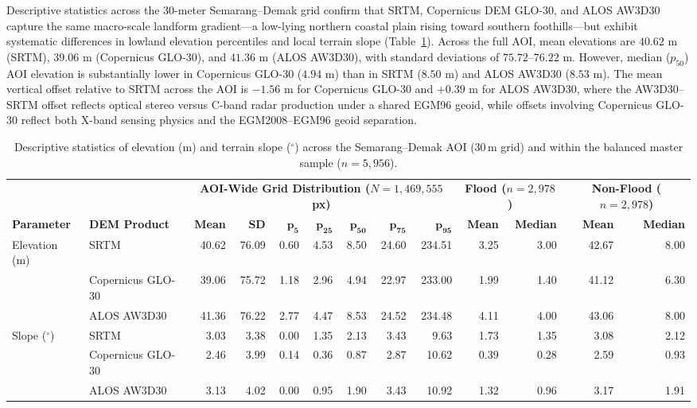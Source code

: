 \documentclass[11pt,twoside]{article}
\begin{document}
Descriptive statistics across the 30-meter Semarang--Demak grid confirm that SRTM, Copernicus DEM GLO-30, and ALOS AW3D30 capture the same macro-scale landform gradient---a low-lying northern coastal plain rising toward southern foothills---but exhibit systematic differences in lowland elevation percentiles and local terrain slope (Table~\ref{tab:dem-stats}). Across the full AOI, mean elevations are $40.62\text{ m}$ (SRTM), $39.06\text{ m}$ (Copernicus GLO-30), and $41.36\text{ m}$ (ALOS AW3D30), with standard deviations of $75.72\text{--}76.22\text{ m}$. However, median ($p_{50}$) AOI elevation is substantially lower in Copernicus GLO-30 ($4.94\text{ m}$) than in SRTM ($8.50\text{ m}$) and ALOS AW3D30 ($8.53\text{ m}$). The mean vertical offset relative to SRTM across the AOI is $-1.56\text{ m}$ for Copernicus GLO-30 and $+0.39\text{ m}$ for ALOS AW3D30, where the AW3D30--SRTM offset reflects optical stereo versus C-band radar production under a shared EGM96 geoid, while offsets involving Copernicus GLO-30 reflect both X-band sensing physics and the EGM2008--EGM96 geoid separation.

\begin{table}[!htbp]
\small
\centering
\caption{Descriptive statistics of elevation (m) and terrain slope ($^\circ$) across the Semarang--Demak AOI (30\,m grid) and within the balanced master sample ($n = 5{,}956$).}
\label{tab:dem-stats}
\begin{adjustbox}{max width=\textwidth}
\begin{tabular}{ll rrrrrrr rr rr}
\toprule
& & \multicolumn{7}{c}{\textbf{AOI-Wide Grid Distribution ($N = 1{,}469{,}555$ px)}} & \multicolumn{2}{c}{\textbf{Flood ($n=2{,}978$)}} & \multicolumn{2}{c}{\textbf{Non-Flood ($n=2{,}978$)}} \\
\cmidrule(lr){3-9} \cmidrule(lr){10-11} \cmidrule(lr){12-13}
\textbf{Parameter} & \textbf{DEM Product} & \textbf{Mean} & \textbf{SD} & $\boldsymbol{p_5}$ & $\boldsymbol{p_{25}}$ & $\boldsymbol{p_{50}}$ & $\boldsymbol{p_{75}}$ & $\boldsymbol{p_{95}}$ & \textbf{Mean} & \textbf{Median} & \textbf{Mean} & \textbf{Median} \\
\midrule
Elevation (m) & SRTM & 40.62 & 76.09 & 0.60 & 4.53 & 8.50 & 24.60 & 234.51 & 3.25 & 3.00 & 42.67 & 8.00 \\
              & Copernicus GLO-30 & 39.06 & 75.72 & 1.18 & 2.96 & 4.94 & 22.97 & 233.00 & 1.99 & 1.40 & 41.12 & 6.30 \\
              & ALOS AW3D30 & 41.36 & 76.22 & 2.77 & 4.47 & 8.53 & 24.52 & 234.48 & 4.11 & 4.00 & 43.06 & 8.00 \\
\midrule
Slope ($^\circ$) & SRTM & 3.03 & 3.38 & 0.00 & 1.35 & 2.13 & 3.43 & 9.63 & 1.73 & 1.35 & 3.08 & 2.12 \\
                 & Copernicus GLO-30 & 2.46 & 3.99 & 0.14 & 0.36 & 0.87 & 2.87 & 10.62 & 0.39 & 0.28 & 2.59 & 0.93 \\
                 & ALOS AW3D30 & 3.13 & 4.02 & 0.00 & 0.95 & 1.90 & 3.43 & 10.92 & 1.32 & 0.96 & 3.17 & 1.91 \\
\bottomrule
\end{tabular}
\end{adjustbox}
\end{table}
\end{document}
